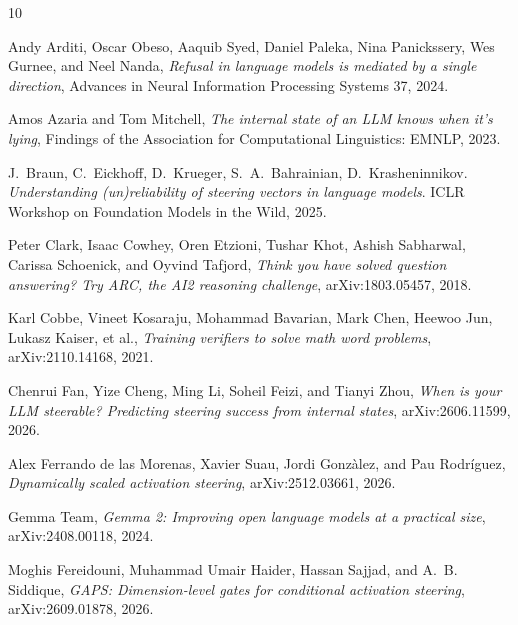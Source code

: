 \documentclass{article}
\begin{document}
\providecommand{\bysame}{\leavevmode\hbox to3em{\hrulefill}\thinspace}

\begin{thebibliography}{10}

Andy Arditi, Oscar Obeso, Aaquib Syed, Daniel Paleka, Nina Panickssery, Wes
  Gurnee, and Neel Nanda, \emph{Refusal in language models is mediated by a
  single direction}, Advances in Neural Information Processing Systems 37, 2024.

Amos Azaria and Tom Mitchell, \emph{The internal state of an LLM knows when it's
  lying}, Findings of the Association for Computational Linguistics: EMNLP, 2023.

J.~Braun, C.~Eickhoff, D.~Krueger, S.~A.~Bahrainian, D.~Krasheninnikov.
  \emph{Understanding (un)reliability of steering vectors in language models}.
  ICLR Workshop on Foundation Models in the Wild, 2025.

Peter Clark, Isaac Cowhey, Oren Etzioni, Tushar Khot, Ashish Sabharwal, Carissa
  Schoenick, and Oyvind Tafjord, \emph{Think you have solved question answering?
  Try ARC, the AI2 reasoning challenge}, arXiv:1803.05457, 2018.

Karl Cobbe, Vineet Kosaraju, Mohammad Bavarian, Mark Chen, Heewoo Jun, Lukasz
  Kaiser, et al., \emph{Training verifiers to solve math word problems},
  arXiv:2110.14168, 2021.

Chenrui Fan, Yize Cheng, Ming Li, Soheil Feizi, and Tianyi Zhou, \emph{When is
  your LLM steerable? Predicting steering success from internal states},
  arXiv:2606.11599, 2026.

Alex Ferrando de las Morenas, Xavier Suau, Jordi Gonz\`alez, and Pau
  Rodr\'iguez, \emph{Dynamically scaled activation steering}, arXiv:2512.03661,
  2026.

Gemma Team, \emph{Gemma 2: Improving open language models at a practical size},
  arXiv:2408.00118, 2024.

Moghis Fereidouni, Muhammad Umair Haider, Hassan Sajjad, and A.~B. Siddique,
  \emph{GAPS: Dimension-level gates for conditional activation steering},
  arXiv:2609.01878, 2026.


\end{thebibliography}
\end{document}

